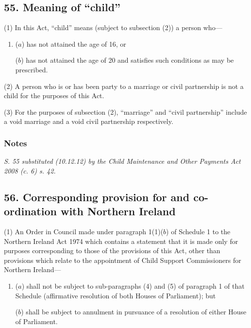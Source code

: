 \documentclass[a4paper]{article}
\newcommand\amendment[1]{\subsubsection*{Notes}{\itshape\frenchspacing\footnotesize #1 \par}}
\begin{document}
\subsection{55. Meaning of ``child''}

(1) In this Act, “child” means (subject to subsection (2)) a person who---
\begin{enumerate}\item[]
($a$) has not attained the age of 16, or

($b$) has not attained the age of 20 and satisfies such conditions as may be prescribed.
\end{enumerate}

(2)
A person who is or has been party to a marriage or civil partnership is not a child for the purposes of this Act.

(3)
For the purposes of subsection (2), “marriage” and “civil partnership” include a void marriage and a void civil partnership respectively.

\amendment{
S. 55 substituted (10.12.12) by the Child Maintenance and Other Payments Act 2008 (c. 6) s. 42.
}

\subsection{56. Corresponding provision for and co-ordination with Northern Ireland}

(1) An Order in Council made under paragraph 1(1)($b$) of Schedule 1 to the Northern Ireland Act 1974 which contains a statement that it is made only for purposes corresponding to those of the provisions of this Act, other than provisions which relate to the appointment of Child Support Commissioners for Northern Ireland---
\begin{enumerate}\item[]
($a$) shall not be subject to sub-paragraphs (4) and (5) of paragraph 1 of that Schedule (affirmative resolution of both Houses of Parliament); but

($b$) shall be subject to annulment in pursuance of a resolution of either House of Parliament.
\end{enumerate}
\end{document}
